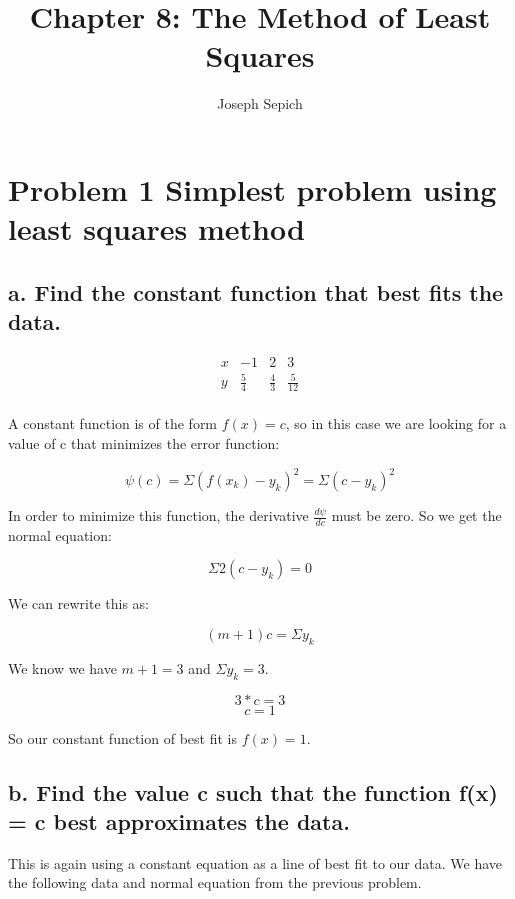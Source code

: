 \documentclass[]{article}
\title{Chapter 8: The Method of Least Squares}
\subtitle{Joseph Sepich}
\author{}
\date{}
\begin{document}
\maketitle

{
\setcounter{tocdepth}{2}
\tableofcontents
}
\section{Problem 1 Simplest problem using least squares
method}\label{problem-1-simplest-problem-using-least-squares-method}

\subsection{a. Find the constant function that best fits the
data.}\label{a.-find-the-constant-function-that-best-fits-the-data.}

\[
\begin{array}{c|c|c|c|} 
x & -1 & 2 & 3\\
y & \frac54 & \frac43 & \frac5{12}\\
\end{array}
\]

A constant function is of the form \(f(x) = c\), so in this case we are
looking for a value of c that minimizes the error function:

\[\psi(c) = \Sigma(f(x_k) - y_k)^2 = \Sigma(c - y_k)^2\]

In order to minimize this function, the derivative \(\frac{d\psi}{dc}\)
must be zero. So we get the normal equation:

\[\Sigma2(c - y_k)=0\]

We can rewrite this as:

\[(m+1)c = \Sigma y_k\]

We know we have \(m+1 = 3\) and \(\Sigma y_k = 3\).

\[3*c = 3\] \[c = 1\]

So our constant function of best fit is \(f(x) = 1\).

\subsection{b. Find the value c such that the function f(x) = c best
approximates the
data.}\label{b.-find-the-value-c-such-that-the-function-fx-c-best-approximates-the-data.}

This is again using a constant equation as a line of best fit to our
data. We have the following data and normal equation from the previous
problem.
\end{document}
